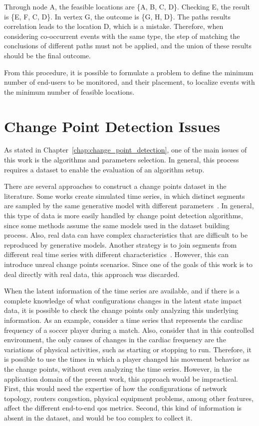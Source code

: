 Through node A, the feasible locations are \{A, B, C, D\}.
Checking E, the result is \{E, F, C, D\}.
In vertex G, the outcome is \{G, H, D\}.
The paths results correlation leads to the location D, which is a mistake.
Therefore, when considering co-occurrent events with the same type, the step of
matching the conclusions of different paths must not be applied, and the
union of these results should be the final outcome.

From this procedure, it is possible to formulate a
problem to define the minimum number of end-users to be monitored, and their
placement, to localize events with the minimum number of feasible locations.

\section{Change Point Detection Issues}

As stated in Chapter~\ref{chap:change_point_detection}, one of the main issues
of this work is the algorithms and parameters selection.
In general, this process requires a dataset to enable the evaluation of an
algorithm setup.

There are several approaches to construct a
change points dataset in the literature.
Some works create simulated time series, in which distinct segments are sampled
by the same generative model with different
parameters~\cite{change_point_detection_in_time_series_data_by_relative_density_ratio_estimation}.
In general, this type of data is more easily handled by change point detection
algorithms, since some methods assume the same models used in the dataset
building process. Also, real data can have complex characteristics that are
difficult to be reproduced by generative models. Another strategy is to join
segments from different real time series with different
characteristics~\cite{inertial_hidden_markov_models_modeling_change_in_multivariate_time_series}.
However, this can introduce unreal change points scenarios. Since one of
the goals of this work is to deal directly with real data,
this approach was discarded.

When the latent information of the time series are available, and if there is a
complete knowledge of what configurations changes in the latent state impact
data, it is possible to check the change points only analyzing this underlying
information. As an example, consider a time series that represents the cardiac
frequency of a soccer player during a match. Also, consider that in this
controlled environment, the only causes of changes in the cardiac frequency are
the variations of physical activities, such as starting or stopping to run.
Therefore,
it is possible to use the times in which a player changed his movement behavior
as the change points, without even analyzing the time series. However, in the
application domain of the present work, this approach would be impractical.
First, this would need the expertise of how the configurations of network
topology, routers congestion, physical equipment problems, among other features,
affect the different end-to-end \gls*{qos} metrics.
Second, this kind of information is absent in the dataset, and would be too
complex to collect it.


